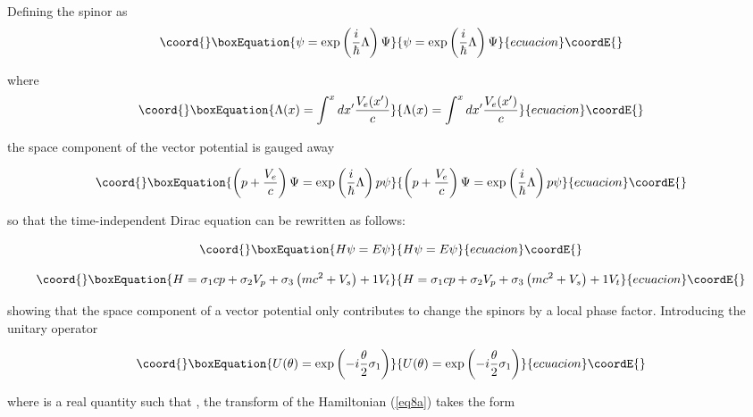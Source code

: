 \documentclass[a4paper,12pt,titlepage]{article}
\begin{document}
Defining the spinor \myHighlight{$\psi $}\coordHE{} as
\begin{equation}\coord{}\boxEquation{
\psi =\exp \left( \frac{i}{\hbar }\Lambda \right) \Psi  \label{eq5}
}{
\psi =\exp \left( \frac{i}{\hbar }\Lambda \right) \Psi  }{ecuacion}\coordE{}\end{equation}

\noindent where
\begin{equation}\coord{}\boxEquation{
\Lambda (x)=\int^{x}dx^{\prime }\frac{V_{e}(x^{\prime })}{c}  \label{eq6}
}{
\Lambda (x)=\int^{x}dx^{\prime }\frac{V_{e}(x^{\prime })}{c}  }{ecuacion}\coordE{}\end{equation}

\noindent the space component of the vector potential is gauged away

\begin{equation}\coord{}\boxEquation{
\left( p+\frac{V_{e}}{c}\right) \Psi =\exp \left( \frac{i}{\hbar }\Lambda
\right) p\psi  \label{eq7}
}{
\left( p+\frac{V_{e}}{c}\right) \Psi =\exp \left( \frac{i}{\hbar }\Lambda
\right) p\psi  }{ecuacion}\coordE{}\end{equation}

\noindent so that the time-independent Dirac equation can be rewritten as
follows:

\begin{equation}\coord{}\boxEquation{
H\psi =E\psi  \label{eq8}
}{
H\psi =E\psi  }{ecuacion}\coordE{}\end{equation}

\begin{equation}\coord{}\boxEquation{
H=\sigma _{1}cp+\sigma _{2}V_{p}+\sigma _{3}\left( mc^{2}+V_{s}\right)
+1V_{t}  \label{eq8a}
}{
H=\sigma _{1}cp+\sigma _{2}V_{p}+\sigma _{3}\left( mc^{2}+V_{s}\right)
+1V_{t}  }{ecuacion}\coordE{}\end{equation}

\noindent showing that the space component of a vector potential only
contributes to change the spinors by a local phase factor. Introducing the
unitary operator

\begin{equation}\coord{}\boxEquation{
U(\theta )=\exp \left( -i\frac{\theta }{2}\sigma _{1}\right)  \label{eq9}
}{
U(\theta )=\exp \left( -i\frac{\theta }{2}\sigma _{1}\right)  }{ecuacion}\coordE{}\end{equation}

\noindent where \myHighlight{$\theta $}\coordHE{} is a real quantity such that \myHighlight{$-\pi \leq \theta
\leq \pi $}\coordHE{}, the transform of the Hamiltonian (\ref{eq8a}) takes the form
\end{document}
